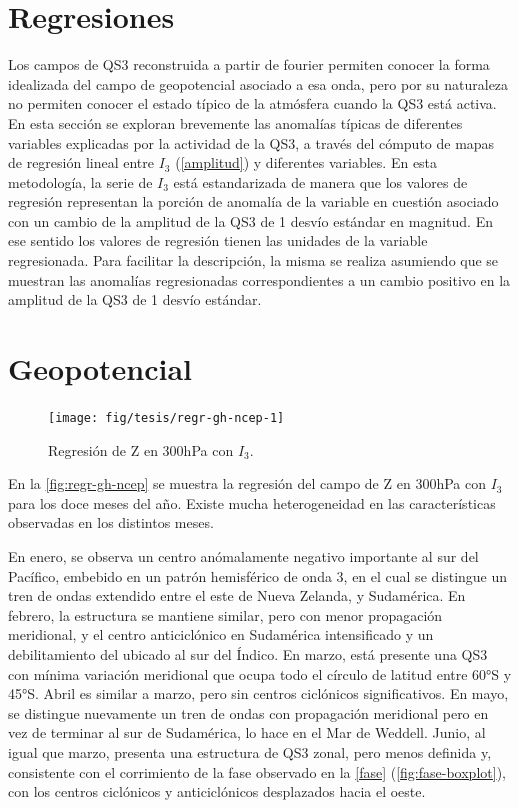 \documentclass[spanish,a4paper,12pt,oneside]{book}
\begin{document}
\section{Regresiones}\label{regresiones}

Los campos de QS3 reconstruida a partir de fourier permiten conocer la
forma idealizada del campo de geopotencial asociado a esa onda, pero por
su naturaleza no permiten conocer el estado típico de la atmósfera
cuando la QS3 está activa. En esta sección se exploran brevemente las
anomalías típicas de diferentes variables explicadas por la actividad de
la QS3, a través del cómputo de mapas de regresión lineal entre \(I_3\)
(\autoref{amplitud}) y diferentes variables. En esta metodología, la
serie de \(I_3\) está estandarizada de manera que los valores de
regresión representan la porción de anomalía de la variable en cuestión
asociado con un cambio de la amplitud de la QS3 de 1 desvío estándar en
magnitud. En ese sentido los valores de regresión tienen las unidades de
la variable regresionada. Para facilitar la descripción, la misma se
realiza asumiendo que se muestran las anomalías regresionadas
correspondientes a un cambio positivo en la amplitud de la QS3 de 1
desvío estándar.

\section*{Geopotencial}

\begin{landscape}\begin{figure}

{\centering \texttt{[image: fig/tesis/regr-gh-ncep-1]} 

}

\caption{Regresión de Z en 300hPa con $I_3$.}\label{fig:regr-gh-ncep}
\end{figure}
\end{landscape}

En la \autoref{fig:regr-gh-ncep} se muestra la regresión del campo de Z
en 300hPa con \(I_3\) para los doce meses del año. Existe mucha
heterogeneidad en las características observadas en los distintos meses.

En enero, se observa un centro anómalamente negativo importante al sur
del Pacífico, embebido en un patrón hemisférico de onda 3, en el cual se
distingue un tren de ondas extendido entre el este de Nueva Zelanda, y
Sudamérica. En febrero, la estructura se mantiene similar, pero con
menor propagación meridional, y el centro anticiclónico en Sudamérica
intensificado y un debilitamiento del ubicado al sur del Índico. En
marzo, está presente una QS3 con mínima variación meridional que ocupa
todo el círculo de latitud entre 60°S y 45°S. Abril es similar a marzo,
pero sin centros ciclónicos significativos. En mayo, se distingue
nuevamente un tren de ondas con propagación meridional pero en vez de
terminar al sur de Sudamérica, lo hace en el Mar de Weddell. Junio, al
igual que marzo, presenta una estructura de QS3 zonal, pero menos
definida y, consistente con el corrimiento de la fase observado en la
\autoref{fase} (\autoref{fig:fase-boxplot}), con los centros ciclónicos
y anticiclónicos desplazados hacia el oeste.
\end{document}
